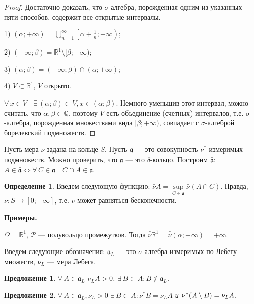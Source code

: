 \documentclass[12pt,titlepage]{article}
\newcounter{tema}
\newcommand{\prim}{\vspace{5pt}\noindent\textbf{Примеры.}}
\newtheorem{predl}{Предложение}[tema]
\theoremstyle{definition}
\newtheorem{defen}{Определение}[tema]
\newcommand*{\p}[1]{#1\nobreak\discretionary{}{\hbox{$\mathsurround=0pt #1$}}{}}
\begin{document}
\begin{proof}
Достаточно доказать, что $\sigma$-алгебра, порожденная одним из
указанных пяти способов, содержит все открытые интервалы.

1) $(\alpha;+\infty)=\bigcup\limits_{n=1}^\infty\left[\alpha+\frac 1
n;+\infty\right)$;

2) $(-\infty;\beta)=\mathbb{R}^1\setminus[\beta;+\infty)$;

3) $(\alpha;\beta)=(-\infty;\beta)\cap(\alpha;+\infty)$;

4) $V\subset\mathbb{R}^1$, $V$ открыто.

$\forall\, x\in V\quad\exists\, (\alpha;\beta)\subset V,
x\in(\alpha;\beta)$. Немного уменьшив этот интервал, можно считать,
что $\alpha,\beta\in\mathbb{Q}$, поэтому $V$ есть объединение
(счетных) интервалов, т.е. $\sigma$-алгебра, порожденная множествами
вида $[\beta;+\infty)$, совпадает с $\sigma$-алгеброй борелевский
подмножеств.
\end{proof}

Пусть мера $\nu$ задана на кольце $S$. Пусть $\mathfrak{a}$ --- это
совокупность $\nu^*$-измеримых подмножеств. Можно проверить, что
$\mathfrak{a}$ --- это $\delta$-кольцо. Построим
$\bar{\mathfrak{a}}$: $A\in\bar{\mathfrak{a}}\Leftrightarrow
\forall\, C\in\mathfrak{a}\quad C\cap A\in\mathfrak{a}$.

\begin{defen}
Введем следующую функцию:
$\bar{\bar{\nu}}A=\sup\limits_{C\in\mathfrak{a}}\bar{\nu}(A\cap C)$.
Правда, $\bar{\bar{\nu}}\colon S\to [0;+\infty]$, т.е.
$\bar{\bar{\nu}}$ может равняться бесконечности.
\end{defen}

\prim

$\Omega=\mathbb{R}^1$, $\mathcal{P}$ --- полукольцо промежутков.
Тогда
$\bar{\bar{\nu}}\mathbb{R}^1=\bar{\bar{\nu}}(\alpha;+\infty)=+\infty$.

\vspace{5pt}

Введем следующие обозначения: $\mathfrak{a}_L$ --- это
$\sigma$-алгебра измеримых по Лебегу множеств, $\nu_L$ --- мера
Лебега.

\begin{predl}
$\forall\, A\in\mathfrak{a}_L$ $\nu_L A>0$. $\exists\, B\subset A:
B\not \in \mathfrak{a}_L$.
\end{predl}

\begin{predl}
$\forall\, A\in\mathfrak{a}_L, \nu_L>0$ $\exists\, B\subset
A:\nu^*B=\nu_L A$ и $\nu^*(A\setminus B)\p=\nu_L A$.
\end{predl}
\end{document}
